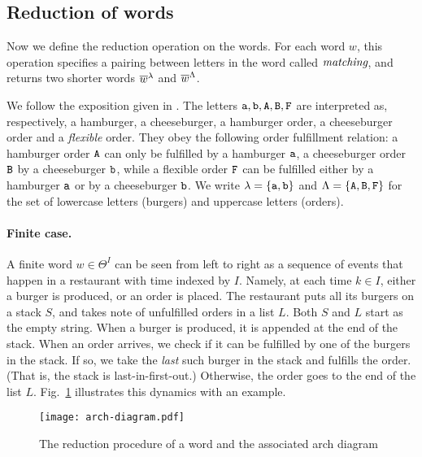 \documentclass[a4paper]{article}
\begin{document}
\subsection{Reduction of words}
Now we define the reduction operation on the words.
For each word $w$, this operation specifies a pairing between letters in the word called $\emph{matching}$, and returns two shorter words $\overline{w}^\lambda$ and $\overline{w}^\Lambda$.

We follow the exposition given in \cite{She11}.
The letters $\mathtt{a},\mathtt{b},\mathtt{A},\mathtt{B},\mathtt{F}$ are interpreted as, respectively, a hamburger, a cheeseburger, a hamburger order, a cheeseburger order and a \emph{flexible} order.
They obey the following order fulfillment relation: a hamburger order $\mathtt{A}$ can only be fulfilled by a hamburger $\mathtt{a}$, a cheeseburger order $\mathtt{B}$ by a cheeseburger $\mathtt{b}$, while a flexible order $\mathtt{F}$ can be fulfilled either by a hamburger $\mathtt{a}$ or by a cheeseburger $\mathtt{b}$.
We write $\lambda=\{\mathtt{a},\mathtt{b}\}$ and $\Lambda=\{\mathtt{A},\mathtt{B},\mathtt{F}\}$ for the set of lowercase letters (burgers) and uppercase letters (orders).

\paragraph{Finite case.} 
A finite word $w\in\Theta^I$ can be seen from left to right as a sequence of events that happen in a restaurant with time indexed by $I$.
Namely, at each time $k\in I$, either a burger is produced, or an order is placed.
The restaurant puts all its burgers on a stack $S$, and takes note of unfulfilled orders in a list $L$.
Both $S$ and $L$ start as the empty string.
When a burger is produced, it is appended at the end of the stack.
When an order arrives, we check if it can be fulfilled by one of the burgers in the stack.
If so, we take the \emph{last} such burger in the stack and fulfills the order. (That is, the stack is last-in-first-out.)
Otherwise, the order goes to the end of the list $L$.
Fig.~\ref{fig:arch diagram} illustrates this dynamics with an example.

\begin{figure}[h]
\begin{center}
\hspace{1cm}
\texttt{[image: arch-diagram.pdf]}
\caption{The reduction procedure of a word and the associated arch diagram}
\label{fig:arch diagram}
\end{center}
\end{figure}
\end{document}
